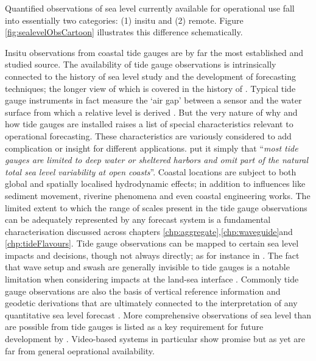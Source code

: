 Quantified observations of sea level currently available for operational use fall into essentially two categories: (1) insitu and (2) remote.    Figure \ref{fig:sealevelObsCartoon} illustrates this difference schematically.

Insitu observations from coastal tide gauges are by far the most established and studied source.    The availability of tide gauge observations is intrinsically connected to the history of sea level study and the development of forecasting techniques; the longer view of which is covered in the history of \citeauthor{Cartwright:2000tt}.
Typical tide gauge instruments in fact measure the `air gap' between a sensor and the water surface from which a relative level is derived \citep{PCTMSL-sp9}. 
But the very nature of why and how tide gauges are installed raises a list of special characteristics relevant to operational forecasting. These characteristics are variously considered to add complication or insight for different applications. \citeauthor{10.1175/jtech-d-18-0203.1} put it simply that ``\textit{most tide gauges are limited to deep water or sheltered harbors and omit part of the natural total sea level variability at open coasts}''.   
Coastal locations are subject to both global and spatially localised hydrodynamic effects; in addition to influences like sediment movement, riverine phenomena and even coastal engineering works.  The limited extent to which the range of scales present in the tide gauge observations can be adequately represented by any forecast system is a fundamental characterisation discussed across chapters \ref{chp:aggregate},\ref{chp:waveguide}and \ref{chp:tideFlavours}.    
Tide gauge observations can be mapped to certain sea level impacts and decisions, though not always directly; as for instance in \cite{Hague:2019ha}.    The fact that wave setup and swash are generally invisible to tide gauges is a notable limitation when considering impacts at the land-sea interface \citep{Serafin:2017fl}.
Commonly tide gauge observations are also the basis of vertical reference information and geodetic derivations that are ultimately connected to the interpretation of any quantitative sea level forecast \citep{Woppelmann:2006un}\citep{AVWS2021}.
More comprehensive observations of sea level than are possible from tide gauges is listed as a key requirement for future development by \citeauthor{10.3389/fmars.2019.00437}.    Video-based systems in particular show promise \citep{10.1175/jtech-d-18-0203.1}\cite{2018agufmep52d..26h} but as yet are far from general oeprational availability. 

